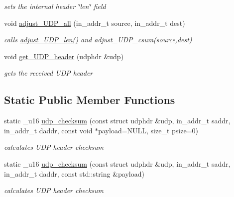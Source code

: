 \begin{CompactItemize}
\begin{CompactList}\small\item\em sets the internal header \char`\"{}len\char`\"{} field \item\end{CompactList}\item 
void \hyperlink{classsocketpp_1_1UDP__RawSocket_4fe2e6b184ca8f8248a187df30e12fd2}{adjust\_\-UDP\_\-all} (in\_\-addr\_\-t source, in\_\-addr\_\-t dest)
\begin{CompactList}\small\item\em calls \hyperlink{classsocketpp_1_1UDP__RawSocket_1caa413cfe4f72d8c0aeccdcb10469b5}{adjust\_\-UDP\_\-len()} and adjust\_\-UDP\_\-csum(source,dest) \item\end{CompactList}\item 
void \hyperlink{classsocketpp_1_1UDP__RawSocket_597a30fc537dce06c85663add29defdc}{get\_\-UDP\_\-header} (udphdr \&udp)
\begin{CompactList}\small\item\em gets the received UDP header \item\end{CompactList}\end{CompactItemize}
\subsection*{Static Public Member Functions}
\begin{CompactItemize}
\item 
static \_\-u16 \hyperlink{classsocketpp_1_1UDP__RawSocket_095971358f1de99857aaf649aae9b1ea}{udp\_\-checksum} (const struct udphdr \&udp, in\_\-addr\_\-t saddr, in\_\-addr\_\-t daddr, const void $\ast$payload=NULL, size\_\-t psize=0)
\begin{CompactList}\small\item\em calculates UDP header checksum \item\end{CompactList}\item 
static \_\-u16 \hyperlink{classsocketpp_1_1UDP__RawSocket_331a9aa1b1bc9aa16a25954061c04551}{udp\_\-checksum} (const struct udphdr \&udp, in\_\-addr\_\-t saddr, in\_\-addr\_\-t daddr, const std::string \&payload)
\begin{CompactList}\small\item\em calculates UDP header checksum \item\end{CompactList}\end{CompactItemize}
